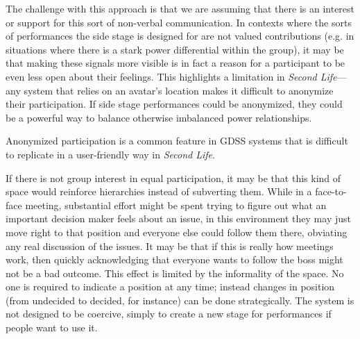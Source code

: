 The challenge with this approach is that we are assuming that there is an interest or support for this sort of non-verbal communication. In contexts where the sorts of performances the side stage is designed for are not valued contributions (e.g. in situations where there is a stark power differential within the group), it may be that making these signals more visible is in fact a reason for a participant to be even less open about their feelings. This highlights a limitation in \emph{Second Life}---any system that relies on an avatar's location makes it difficult to anonymize their participation. If side stage performances could be anonymized, they could be a powerful way to balance otherwise imbalanced power relationships. 

Anonymized participation is a common feature in GDSS systems that is difficult to replicate in a user-friendly way in \emph{Second Life}.

If there is not group interest in equal participation, it may be that this kind of space would reinforce hierarchies instead of subverting them. While in a face-to-face meeting, substantial effort might be spent trying to figure out what an important decision maker feels about an issue, in this environment they may just move right to that position and everyone else could follow them there, obviating any real discussion of the issues. It may be that if this is really how meetings work, then quickly acknowledging that everyone wants to follow the boss might not be a bad outcome. This effect is limited by the informality of the space. No one is required to indicate a position at any time; instead changes in position (from undecided to decided, for instance) can be done strategically. The system is not designed to be coercive, simply to create a new stage for performances if people want to use it.

